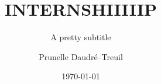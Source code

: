 \title{INTERNSHIIIIIP}
\subtitle{A pretty subtitle}
\author{Prunelle Daudré--Treuil}
\date{\today}
\def\supervisor{Mr. RANDOM}
\def\company{LORIA ?}

\def\logo{img/logos/pretty.png}
\def\logoSection{img/logos/pretty.png}
\def\logoCompany{img/logos/loria.png}

